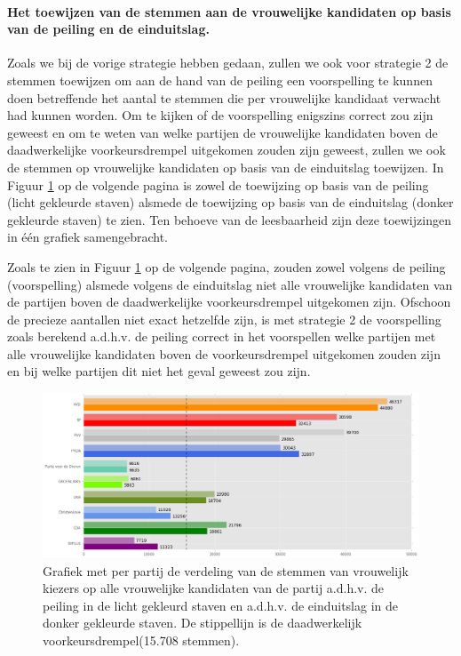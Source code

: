 \paragraph{Het toewijzen van de stemmen aan de vrouwelijke kandidaten op basis van de peiling en de einduitslag.}
Zoals we bij de vorige strategie hebben gedaan, zullen we ook voor strategie 2 de stemmen toewijzen om aan de hand van de peiling een voorspelling te kunnen doen betreffende het aantal te stemmen die per vrouwelijke kandidaat verwacht had kunnen worden. Om te kijken of de voorspelling enigszins correct zou zijn geweest en om te weten van welke partijen de vrouwelijke kandidaten boven de daadwerkelijke voorkeursdrempel uitgekomen zouden zijn geweest, zullen we ook de stemmen op vrouwelijke kandidaten op basis van de einduitslag toewijzen. In Figuur \ref{fig:stemmenS2V} op de volgende pagina is zowel de toewijzing op basis van de peiling (licht gekleurde staven) alsmede de toewijzing op basis van de einduitslag (donker gekleurde staven) te zien. Ten behoeve van de leesbaarheid zijn deze toewijzingen in één grafiek samengebracht.  

Zoals te zien in Figuur \ref{fig:stemmenS2V} op de volgende pagina, zouden zowel volgens de peiling (voorspelling) alsmede volgens de einduitslag niet alle vrouwelijke kandidaten van de partijen boven de daadwerkelijke voorkeursdrempel uitgekomen zijn. Ofschoon de precieze aantallen niet exact hetzelfde zijn, is met strategie 2 de voorspelling zoals berekend a.d.h.v. de peiling correct in het voorspellen welke partijen met alle vrouwelijke kandidaten boven de voorkeursdrempel uitgekomen zouden zijn en bij welke partijen dit niet het geval geweest zou zijn.


\begin{figure}[H]

	\includegraphics[width=\linewidth]	{stemmen_op_vrouwen_willekeurig_samen.png}

			\caption{Grafiek met per partij de verdeling van de stemmen van vrouwelijk kiezers op alle vrouwelijke kandidaten van de partij a.d.h.v. de peiling \citep{IPSOS} in de licht gekleurd staven en a.d.h.v. de einduitslag \citep{Kiesraad_databank} in de donker gekleurde staven. De stippellijn is de daadwerkelijk voorkeursdrempel(15.708 stemmen).}

\label{fig:stemmenS2V}
\end{figure}


